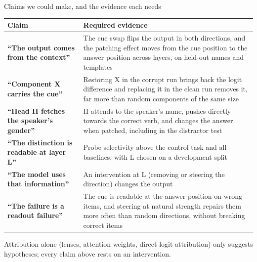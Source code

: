 \documentclass[aspectratio=169,10pt]{beamer}
\begin{document}
\begin{frame}{Claims we could make, and the evidence each needs}
\footnotesize
\begin{tabularx}{\textwidth}{@{}>{\raggedright\arraybackslash\bfseries}p{} Y@{}}
\toprule
\normalfont\textbf{Claim} & \textbf{Required evidence} \\
\midrule
``The output comes from the context'' & The cue swap flips the output in both directions, and the patching effect moves from the cue position to the answer position across layers, on held-out names and templates \\[2pt]
``Component X carries the cue'' & Restoring X in the corrupt run brings back the logit difference and replacing it in the clean run removes it, far more than random components of the same size \\[2pt]
``Head H fetches the speaker's gender'' & H attends to the speaker's name, pushes directly towards the correct verb, and changes the answer when patched, including in the distractor test \\[2pt]
``The distinction is readable at layer L'' & Probe selectivity above the control task and all baselines, with L chosen on a development split \\[2pt]
``The model uses that information'' & An intervention at L (removing or steering the direction) changes the output \\[2pt]
``The failure is a readout failure'' & The cue is readable at the answer position on wrong items, and steering at natural strength repairs them more often than random directions, without breaking correct items \\
\bottomrule
\end{tabularx}

\vspace{0.6em}
\small
Attribution alone (lenses, attention weights, direct logit attribution) only suggests hypotheses; \alert{every claim above rests on an intervention}.
\end{frame}
\end{document}
